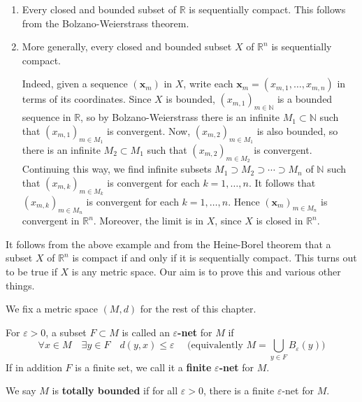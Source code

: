 \documentclass[a4paper,11pt]{article}
\begin{document}
\begin{example}
    \begin{enumerate}
        \item Every closed and bounded subset of $\mathbb{R}$ is sequentially compact. This follows from the Bolzano-Weierstrass theorem.
        \item More generally, every closed and bounded subset $X$ of $\mathbb{R}^{n}$ is sequentially compact. 
        
        Indeed, given a sequence $\left(\mathbf{x}_{m}\right)$ in $X$, write each $\mathbf{x}_{m}=\left(x_{m, 1}, \ldots, x_{m, n}\right)$ in terms of its coordinates. Since $X$ is bounded, $\left(x_{m, 1}\right)_{m \in \mathbb{N}}$ is a bounded sequence in $\mathbb{R}$, so by Bolzano-Weierstrass there is an infinite $M_{1} \subset \mathbb{N}$ such that $\left(x_{m, 1}\right)_{m \in M_{1}}$ is convergent. Now, $\left(x_{m, 2}\right)_{m \in M_{1}}$ is also bounded, so there is an infinite $M_{2} \subset M_{1}$ such that $\left(x_{m, 2}\right)_{m \in M_{2}}$ is convergent. Continuing this way, we find infinite subsets $M_{1} \supset M_{2} \supset \cdots \supset M_{n}$ of $\mathbb{N}$ such that $\left(x_{m, k}\right)_{m \in M_{k}}$ is convergent for each $k=1, \ldots, n$. It follows that $\left(x_{m, k}\right)_{m \in M_{n}}$ is convergent for each $k=1, \ldots, n$. Hence $\left(\mathbf{x}_{m}\right)_{m \in M_{n}}$ is convergent in $\mathbb{R}^{n}$. Moreover, the limit is in $X$, since $X$ is closed in $\mathbb{R}^{n}$.
      \end{enumerate}      
\end{example}
\begin{remark}
    It follows from the above example and from the Heine-Borel theorem that a subset $X$ of $\mathbb{R}^{n}$ is compact if and only if it is sequentially compact. This turns out to be true if $X$ is any metric space. Our aim is to prove this and various other things.
\end{remark}

\begin{definition}
    We fix a metric space $(M, d)$ for the rest of this chapter.

For $\varepsilon>0$, a subset $F \subset M$ is called an $\varepsilon$\textbf{-net} for $M$ if
$$
\forall x \in M \quad \exists y \in F \quad d(y, x) \leqslant \varepsilon \quad \text { (equivalently } M=\bigcup_{y \in F} B_{\varepsilon}(y))
$$
If in addition $F$ is a finite set, we call it a \textbf{finite} $\varepsilon$\textbf{-net} for $M$.

We say $M$ is \textbf{totally bounded} if for all $\varepsilon>0$, there is a finite $\varepsilon$-net for $M$.
\end{definition}
\end{document}
